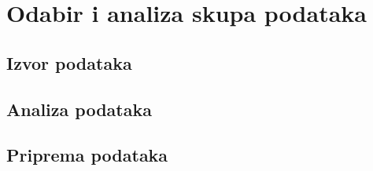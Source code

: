 \section{Odabir i analiza skupa podataka}

\subsection{Izvor podataka}
\subsection{Analiza podataka}
\subsection{Priprema podataka}